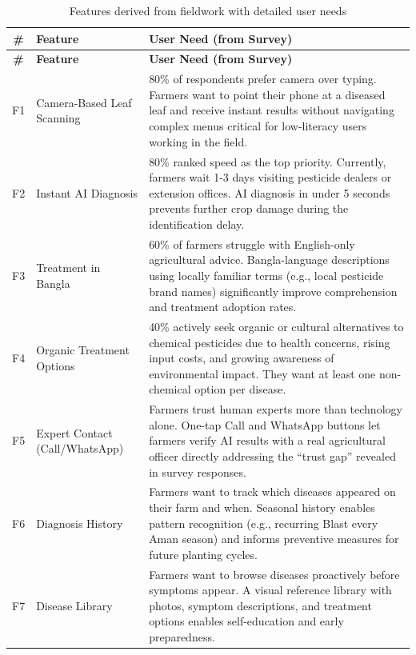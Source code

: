 \documentclass[12pt,a4paper]{article}
\begin{document}
\begin{longtable}{|c|L{3cm}|L{10.5cm}|}
\caption{Features derived from fieldwork with detailed user needs} \\
\hline
{}
\textbf{\#} & \textbf{Feature} & \textbf{User Need (from Survey)} \\
\hline
\endfirsthead
\hline
{}
\textbf{\#} & \textbf{Feature} & \textbf{User Need (from Survey)} \\
\hline
\endhead

F1 & Camera-Based Leaf Scanning & 80\% of respondents prefer camera over typing. Farmers want to point their phone at a diseased leaf and receive instant results without navigating complex menus critical for low-literacy users working in the field. \\
\hline
F2 & Instant AI Diagnosis & 80\% ranked speed as the top priority. Currently, farmers wait 1-3 days visiting pesticide dealers or extension offices. AI diagnosis in under 5 seconds prevents further crop damage during the identification delay. \\
\hline
F3 & Treatment in Bangla & 60\% of farmers struggle with English-only agricultural advice. Bangla-language descriptions using locally familiar terms (e.g., local pesticide brand names) significantly improve comprehension and treatment adoption rates. \\
\hline
F4 & Organic Treatment Options & 40\% actively seek organic or cultural alternatives to chemical pesticides due to health concerns, rising input costs, and growing awareness of environmental impact. They want at least one non-chemical option per disease. \\
\hline
F5 & Expert Contact (Call/WhatsApp) & Farmers trust human experts more than technology alone. One-tap Call and WhatsApp buttons let farmers verify AI results with a real agricultural officer directly addressing the ``trust gap'' revealed in survey responses. \\
\hline
F6 & Diagnosis History & Farmers want to track which diseases appeared on their farm and when. Seasonal history enables pattern recognition (e.g., recurring Blast every Aman season) and informs preventive measures for future planting cycles. \\
\hline
F7 & Disease Library & Farmers want to browse diseases proactively before symptoms appear. A visual reference library with photos, symptom descriptions, and treatment options enables self-education and early preparedness. \\

\end{longtable}
\end{document}
